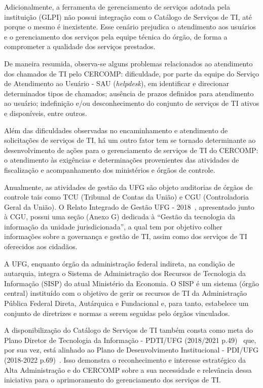 Adicionalmente, a ferramenta de gerenciamento de serviços adotada pela instituição (GLPI) não possui integração com o Catálogo de Serviços de TI, até porque o mesmo é inexistente. Esse cenário prejudica o atendimento aos usuários e o gerenciamento dos serviços pela equipe técnica do órgão, de forma a comprometer a qualidade dos serviços prestados.

De maneira resumida, observa-se alguns problemas relacionados ao atendimento dos chamados de TI pelo CERCOMP: dificuldade, por parte da equipe do Serviço de Atendimento ao Usuário - SAU (\textit{helpdesk}), em identificar e direcionar determinados tipos de chamados; ausência de prazos definidos para atendimento ao usuário; indefinição e/ou desconhecimento do conjunto de serviços de TI ativos e disponíveis, entre outros.

Além das dificuldades observadas no encaminhamento e atendimento de solicitações de serviços de TI, há um outro fator tem se tornado determinante ao desenvolvimento de ações para o gerenciamento de serviços de TI do CERCOMP: o atendimento às exigências e determinações provenientes das atividades de fiscalização e acompanhamento dos ministérios e órgãos de controle.

Anualmente, as atividades de gestão da UFG são objeto auditorias de órgãos de controle tais como TCU (Tribunal de Contas da União) e CGU (Controladoria Geral da União). O Relato Integrado de Gestão UFG - 2018~\cite{RelatorioGestao2018}, apresentado junto à CGU, possui uma seção (Anexo G) dedicada à ``Gestão da tecnologia da informação da unidade jurisdicionada'', a qual tem por objetivo colher informações sobre a governança e gestão de TI, assim como dos serviços de TI oferecidos aos cidadãos.

A UFG, enquanto órgão da administração federal indireta, na condição de autarquia, integra o Sistema de Administração dos Recursos de Tecnologia da Informação (SISP) do atual Ministério da Economia. O SISP é um sistema (órgão central) instituído com o objetivo de gerir os recursos de TI da Administração Pública Federal Direta, Autárquica e Fundacional e, para tanto, estabelece um conjunto de diretrizes e normas a serem seguidas pelo órgãos vinculados.

A disponibilização do Catálogo de Serviços de TI também consta como meta do Plano Diretor de Tecnologia da Informação - PDTI/UFG (2018/2021 p.49)~\cite{PDTI2018} que, por sua vez, está alinhado ao Plano de Desenvolvimento Institucional - PDI/UFG (2018-2022 p.69)~\cite{PDI2018}. Isso demonstra o reconhecimento e interesse estratégico da Alta Administração e do CERCOMP sobre a sua necessidade e relevância dessa iniciativa para o aprimoramento do gerenciamento dos serviços de TI.

